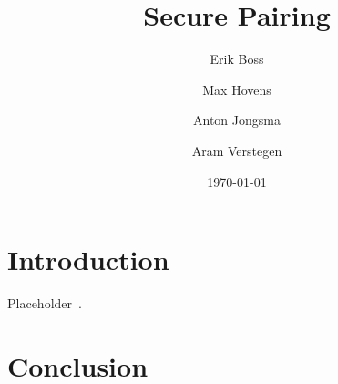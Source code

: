 \documentclass[conference]{sty/IEEEtran}
\title{Secure Pairing}
\author{Erik Boss \and Max Hovens \and Anton Jongsma \and Aram Verstegen}
\date{\today}
\begin{document}
\maketitle

\begin{abstract}
    
\end{abstract}

\section{Introduction}
\label{sec:introduction}

Placeholder~\cite{uzun2007usability}.

\section{Conclusion}
\label{sec:conclusion}



\end{document}
